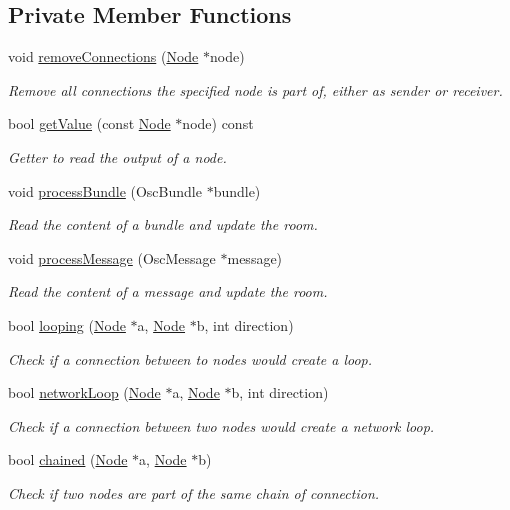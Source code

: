 \subsection*{Private Member Functions}
\begin{DoxyCompactItemize}
\item 
void \mbox{\hyperlink{classRoom_ae87a5e306907216bd57a90ea2a2a5a46}{remove\+Connections}} (\mbox{\hyperlink{classNode}{Node}} $\ast$node)
\begin{DoxyCompactList}\small\item\em Remove all connections the specified node is part of, either as sender or receiver. \end{DoxyCompactList}\item 
bool \mbox{\hyperlink{classRoom_a5b197766e033600e4358c65781e11e73}{get\+Value}} (const \mbox{\hyperlink{classNode}{Node}} $\ast$node) const
\begin{DoxyCompactList}\small\item\em Getter to read the output of a node. \end{DoxyCompactList}\item 
void \mbox{\hyperlink{classRoom_a700df071feffa282696e156791dd0d87}{process\+Bundle}} (Osc\+Bundle $\ast$bundle)
\begin{DoxyCompactList}\small\item\em Read the content of a bundle and update the room. \end{DoxyCompactList}\item 
void \mbox{\hyperlink{classRoom_ab498f123e988e3596722b0e088507b80}{process\+Message}} (Osc\+Message $\ast$message)
\begin{DoxyCompactList}\small\item\em Read the content of a message and update the room. \end{DoxyCompactList}\item 
bool \mbox{\hyperlink{classRoom_a95534f9e0c13a8b75c643c985c851400}{looping}} (\mbox{\hyperlink{classNode}{Node}} $\ast$a, \mbox{\hyperlink{classNode}{Node}} $\ast$b, int direction)
\begin{DoxyCompactList}\small\item\em Check if a connection between to nodes would create a loop. \end{DoxyCompactList}\item 
bool \mbox{\hyperlink{classRoom_aa6f4b7dbdc18771ef12aeeba412414c0}{network\+Loop}} (\mbox{\hyperlink{classNode}{Node}} $\ast$a, \mbox{\hyperlink{classNode}{Node}} $\ast$b, int direction)
\begin{DoxyCompactList}\small\item\em Check if a connection between two nodes would create a network loop. \end{DoxyCompactList}\item 
bool \mbox{\hyperlink{classRoom_a27f7c8a9f47e96223a443c73516a2e36}{chained}} (\mbox{\hyperlink{classNode}{Node}} $\ast$a, \mbox{\hyperlink{classNode}{Node}} $\ast$b)
\begin{DoxyCompactList}\small\item\em Check if two nodes are part of the same chain of connection. \end{DoxyCompactList}\end{DoxyCompactItemize}
